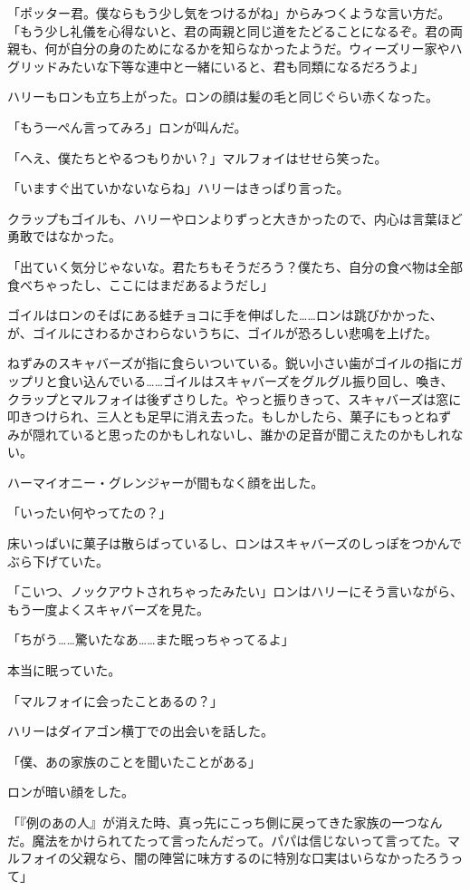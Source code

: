\documentclass[10pt,a4paper]{article}
\begin{document}
\begin{CJK}{UTF8}{min}
「ポッター君。僕ならもう少し気をつけるがね」からみつくような言い方だ。「もう少し礼儀を心得ないと、君の両親と同じ道をたどることになるぞ。君の両親も、何が自分の身のためになるかを知らなかったようだ。ウィーズリー家やハグリッドみたいな下等な連中と一緒にいると、君も同類になるだろうよ」

ハリーもロンも立ち上がった。ロンの顔は髪の毛と同じぐらい赤くなった。

「もう一ぺん言ってみろ」ロンが叫んだ。

「へえ、僕たちとやるつもりかい？」マルフォイはせせら笑った。

「いますぐ出ていかないならね」ハリーはきっぱり言った。

クラップもゴイルも、ハリーやロンよりずっと大きかったので、内心は言葉ほど勇敢ではなかった。

「出ていく気分じゃないな。君たちもそうだろう？僕たち、自分の食べ物は全部食べちゃったし、ここにはまだあるようだし」

ゴイルはロンのそばにある蛙チョコに手を伸ばした……ロンは跳びかかった、が、ゴイルにさわるかさわらないうちに、ゴイルが恐ろしい悲鳴を上げた。

ねずみのスキャバーズが指に食らいついている。鋭い小さい歯がゴイルの指にガップリと食い込んでいる……ゴイルはスキャバーズをグルグル振り回し、喚き、クラップとマルフォイは後ずさりした。やっと振りきって、スキャバーズは窓に叩きつけられ、三人とも足早に消え去った。もしかしたら、菓子にもっとねずみが隠れていると思ったのかもしれないし、誰かの足音が聞こえたのかもしれない。

ハーマイオニー・グレンジャーが間もなく顔を出した。

「いったい何やってたの？」

床いっぱいに菓子は散らばっているし、ロンはスキャバーズのしっぽをつかんでぶら下げていた。

「こいつ、ノックアウトされちゃったみたい」ロンはハリーにそう言いながら、もう一度よくスキャバーズを見た。

「ちがう……驚いたなあ……また眠っちゃってるよ」

本当に眠っていた。

「マルフォイに会ったことあるの？」

ハリーはダイアゴン横丁での出会いを話した。

「僕、あの家族のことを聞いたことがある」

ロンが暗い顔をした。

「『例のあの人』が消えた時、真っ先にこっち側に戻ってきた家族の一つなんだ。魔法をかけられてたって言ったんだって。パパは信じないって言ってた。マルフォイの父親なら、闇の陣営に味方するのに特別な口実はいらなかったろうって」


\end{CJK}
\end{document}
